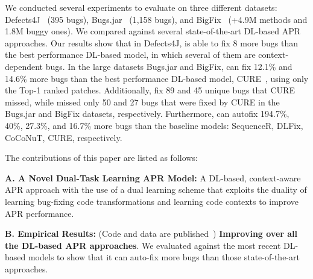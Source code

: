 We conducted several experiments to evaluate {\tool} on three
different datasets: Defects4J~\cite{defects4j} (395 bugs),
Bugs.jar~\cite{saha2018bugs} (1,158 bugs), and
BigFix~\cite{yioopsla19} (+4.9M methods and 1.8M buggy ones).  
We compared {\tool} against several state-of-the-art DL-based APR
approaches. Our results show that in Defects4J, {\tool} is able to fix
8 more bugs than the best performance DL-based model,
in which several of them are context-dependent bugs. 
In the large datasets Bugs.jar and BigFix, {\tool} can fix 12.1\% and 14.6\% more bugs than the best performance DL-based model, CURE~\cite{cure-icse21}, using only the Top-1 ranked patches. Additionally, {\tool} fix 89 and 45 unique bugs that CURE missed, while {\tool} missed only 50 and 27 bugs that were fixed by CURE in the Bugs.jar and BigFix datasets, respectively. 
Furthermore, {\tool} can autofix 194.7\%, 40\%, 27.3\%, and 16.7\% more bugs than the baseline models: SequenceR, DLFix, CoCoNuT, CURE, respectively. 

The contributions of this paper are listed as follows:


{\bf A. A Novel Dual-Task Learning APR Model:} A DL-based,
context-aware APR approach with the use of a dual learning scheme that
exploits the duality of learning bug-fixing code transformations and
learning code contexts to improve APR performance.

{\bf B. Empirical Results:} (Code and data are published~\cite{AutoFix2019})
{\bf Improving over all the DL-based APR approaches}. We evaluated
{\tool} against the most recent DL-based models to show that it can
auto-fix more bugs than those state-of-the-art approaches.

